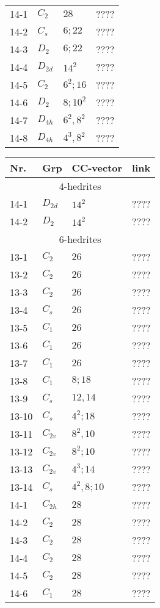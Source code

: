 \documentclass[12pt]{article}
\begin{document}
\begin{table}
\begin{center}
{\begin{minipage}{6cm}
\begin{tabular}{||l|l|l|l||}
14-1	&$C_2$	&$28$		&????\\
14-2	&$C_s$	&$6; 22$		&????\\
14-3	&$D_2$	&$6; 22$		&????\\
14-4	&$D_{2d}$	&$14^2$		&????\\
14-5	&$C_2$	&$6^2; 16$	&????\\
14-6	&$D_2$	&$8; 10^2$	&????\\
14-7	&$D_{4h}$	&$6^2, 8^2$	&????\\
14-8	&$D_{4h}$	&$4^3, 8^2$	&????\\\hline
\end{tabular}
\end{minipage}
\begin{minipage}[t]{6cm}
\begin{tabular}{||l|l|l|l||}
\hline
Nr.	&Grp 	&CC-vector	&link\\\hline
\multicolumn{4}{||c||}{$4$-hedrites}\\\hline
14-1	&$D_{2d}$	&$14^2$		&????\\\hline
14-2	&$D_2$	&$14^2$		&????\\	
\hline
\multicolumn{4}{||c||}{$6$-hedrites}\\\hline
13-1	&$C_2$	&$26$		&????\\
13-2 	&$C_2$	&$26$		&????\\
13-3 	&$C_2$	&$26$		&????\\
13-4 	&$C_s$	&$26$		&????\\
13-5 	&$C_1$	&$26$		&????\\
13-6	&$C_1$	&$26$		&????\\
13-7	&$C_1$	&$26$		&????\\
13-8	&$C_1$	&$8; 18$		&????\\
13-9	&$C_s$	&$12, 14$		&????\\
13-10	&$C_s$	&$4^2; 18$	&????\\
13-11	&$C_{2v}$	&$8^2, 10$	&????\\
13-12	&$C_{2v}$	&$8^2; 10$	&????\\
13-13	&$C_{2v}$	&$4^3; 14$	&????\\
13-14	&$C_s$	&$4^2,8;10$	&????\\\hline
14-1 	&$C_{2h}$	&$28$		&????\\
14-2	&$C_{2}$	&$28$		&????\\
14-3	&$C_2$	&$28$		&????\\
14-4 	&$C_2$	&$28$		&????\\
14-5 	&$C_2$	&$28$		&????\\
14-6 	&$C_1$	&$28$		&????\\

\end{tabular}
\end{minipage}}
\end{center}
\end{table}
\end{document}
